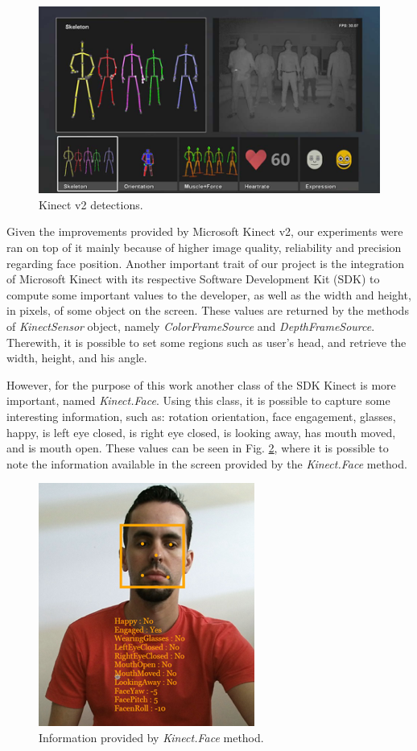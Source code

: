 \documentclass[10pt, conference]{IEEEtran}
\begin{document}
    \begin{figure}[t]
        \centering
        \includegraphics{figures/pic2.png}
        \caption{Kinect v2 detections.}
        \label{fig:fig2}
    \end{figure}

	Given the improvements provided by Microsoft Kinect v2, our experiments were ran on top of it mainly because of higher image quality, reliability and precision regarding face position.
	Another important trait of our project is the integration of Microsoft Kinect with its respective Software Development Kit (SDK) to compute some important values to the developer, as well as the width and height, in pixels, of some object on the screen.
    These values are returned by the methods of \emph{KinectSensor} object, namely \emph{ColorFrameSource} and \emph{DepthFrameSource}.
	Therewith, it is possible to set some regions such as user's head, and retrieve the width, height, and his angle.

	However, for the purpose of this work another class of the SDK Kinect is more important, named \emph{Kinect.Face}. 
	Using this class, it is possible to capture some interesting information, such as: rotation orientation, face engagement, glasses, happy, is left eye closed, is right eye closed, is looking away, has mouth moved, and is mouth open. 
	These values can be seen in Fig. \ref{fig:fig3}, where it is possible to note the information available in the screen provided by the \emph{Kinect.Face} method.

    \begin{figure}[t]
        \centering
        \includegraphics{figures/pic3.png}
        \caption{Information provided by \emph{Kinect.Face} method.}
        \label{fig:fig3}
    \end{figure}
\end{document}
